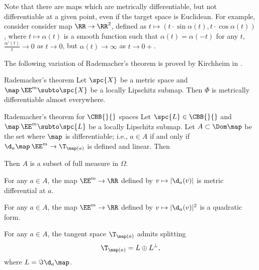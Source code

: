 Note that there are maps which are metrically differentiable,
but not differentiable at a given point,
even if the target space is Euclidean.
For example, consider consider map $\RR\to\RR^2$,
defined as $t\mapsto (t\cdot\sin\alpha(t), t\cdot\cos\alpha(t))$,
where $t\mapsto \alpha(t)$ is a smooth function such that 
$\alpha(t)=\alpha(-t)$ for any $t$,
$\tfrac{\alpha'(t)}t\to 0$ as $t\to 0$, 
but $\alpha(t)\to \infty$ as $t\to 0+$.

The following variation of Rademacher's theorem 
is proved by Kirchheim in \cite{kirchheim}.

\begin{thm}{Rademacher's theorem}\label{thm:rademacher}
Let $\spc{X}$ be a metric space 
and $\map\:\EE^m\subto\spc{X}$ be a locally Lipschitz submap.
Then $\Phi$ is metrically differentiable almost everywhere.
\end{thm}


\qeds

\begin{thm}{Rademacher's theorem for $\CBB{}{}$ spaces}
Let $\spc{L}\in\CBB{}{}$  
and $\map\:\EE^m\subto\spc{L}$ be a locally Lipschitz submap.
Let $A\subset \Dom \map$ be the set where $\map$ is differentiable;
i.e., $a\in A$ if and only if $\d_a\map\:\EE^m\to\T_{\map(a)}$ is defined and linear.
Then 
\begin{subthm}{}
Then $A$ is a subset of full measure in $\Omega$.
\end{subthm}

\begin{subthm}{}
For any $a\in A$,
the map $\EE^m\to\RR$ defined by $v\mapsto |\d_a(v)|$ is metric differential at $a$.
\end{subthm}

\begin{subthm}{}
For any $a\in A$,
the map $\EE^m\to\RR$ defined by $v\mapsto |\d_a(v)|^2$ is a quadratic form.
\end{subthm}

\begin{subthm}{}
For any $a\in A$, the tangent space
$\T_{\map(a)}$ admits splitting
\[\T_{\map(a)}=L\oplus L^\bot,\]
where $L=\Im\d_a\map$.
\end{subthm}
\end{thm}

